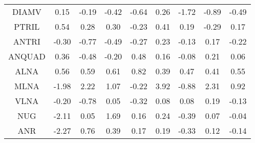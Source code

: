 \documentclass[11pt,a4paper]{report}
\begin{document}
\begin{longtable}{ | c || c | c | c | c | c | c | c || c |}
DIAMV &  \cellcolor[HTML]{FFFFFF} 0.15 &  \cellcolor[HTML]{FFF7F7} -0.19 &  \cellcolor[HTML]{FFF7F7} -0.42 &  \cellcolor[HTML]{FFEFEF} -0.64 &  \cellcolor[HTML]{F7F7FF} 0.26 &  \cellcolor[HTML]{FFD7D7} -1.72 &  \cellcolor[HTML]{FFE7E7} -0.89 &  \cellcolor[HTML]{FFEFEF} -0.49 \\
PTRIL &  \cellcolor[HTML]{EFEFFF} 0.54 &  \cellcolor[HTML]{F7F7FF} 0.28 &  \cellcolor[HTML]{F7F7FF} 0.30 &  \cellcolor[HTML]{FFF7F7} -0.23 &  \cellcolor[HTML]{F7F7FF} 0.41 &  \cellcolor[HTML]{F7F7FF} 0.19 &  \cellcolor[HTML]{FFF7F7} -0.29 &  \cellcolor[HTML]{F7F7FF} 0.17 \\
ANTRI &  \cellcolor[HTML]{FFF7F7} -0.30 &  \cellcolor[HTML]{FFEFEF} -0.77 &  \cellcolor[HTML]{FFEFEF} -0.49 &  \cellcolor[HTML]{FFF7F7} -0.27 &  \cellcolor[HTML]{F7F7FF} 0.23 &  \cellcolor[HTML]{FFFFFF} -0.13 &  \cellcolor[HTML]{F7F7FF} 0.17 &  \cellcolor[HTML]{FFF7F7} -0.22 \\
ANQUAD &  \cellcolor[HTML]{F7F7FF} 0.36 &  \cellcolor[HTML]{FFEFEF} -0.48 &  \cellcolor[HTML]{FFF7F7} -0.20 &  \cellcolor[HTML]{F7F7FF} 0.48 &  \cellcolor[HTML]{F7F7FF} 0.16 &  \cellcolor[HTML]{FFFFFF} -0.08 &  \cellcolor[HTML]{F7F7FF} 0.21 &  \cellcolor[HTML]{FFFFFF} 0.06 \\
ALNA &  \cellcolor[HTML]{EFEFFF} 0.56 &  \cellcolor[HTML]{EFEFFF} 0.59 &  \cellcolor[HTML]{EFEFFF} 0.61 &  \cellcolor[HTML]{E7E7FF} 0.82 &  \cellcolor[HTML]{F7F7FF} 0.39 &  \cellcolor[HTML]{F7F7FF} 0.47 &  \cellcolor[HTML]{F7F7FF} 0.41 &  \cellcolor[HTML]{EFEFFF} 0.55 \\
MLNA &  \cellcolor[HTML]{FFCFCF} -1.98 &  \cellcolor[HTML]{C7C7FF} 2.22 &  \cellcolor[HTML]{E7E7FF} 1.07 &  \cellcolor[HTML]{FFF7F7} -0.22 &  \cellcolor[HTML]{9F9FFF} 3.92 &  \cellcolor[HTML]{FFE7E7} -0.88 &  \cellcolor[HTML]{C7C7FF} 2.31 &  \cellcolor[HTML]{E7E7FF} 0.92 \\
VLNA &  \cellcolor[HTML]{FFF7F7} -0.20 &  \cellcolor[HTML]{FFEFEF} -0.78 &  \cellcolor[HTML]{FFFFFF} 0.05 &  \cellcolor[HTML]{FFF7F7} -0.32 &  \cellcolor[HTML]{FFFFFF} 0.08 &  \cellcolor[HTML]{FFFFFF} 0.08 &  \cellcolor[HTML]{F7F7FF} 0.19 &  \cellcolor[HTML]{FFFFFF} -0.13 \\
NUG &  \cellcolor[HTML]{FFC7C7} -2.11 &  \cellcolor[HTML]{FFFFFF} 0.05 &  \cellcolor[HTML]{D7D7FF} 1.69 &  \cellcolor[HTML]{FFFFFF} 0.16 &  \cellcolor[HTML]{F7F7FF} 0.24 &  \cellcolor[HTML]{FFF7F7} -0.39 &  \cellcolor[HTML]{FFFFFF} 0.07 &  \cellcolor[HTML]{FFFFFF} -0.04 \\
ANR &  \cellcolor[HTML]{FFC7C7} -2.27 &  \cellcolor[HTML]{EFEFFF} 0.76 &  \cellcolor[HTML]{F7F7FF} 0.39 &  \cellcolor[HTML]{F7F7FF} 0.17 &  \cellcolor[HTML]{F7F7FF} 0.19 &  \cellcolor[HTML]{FFF7F7} -0.33 &  \cellcolor[HTML]{FFFFFF} 0.12 &  \cellcolor[HTML]{FFFFFF} -0.14 \\

\end{longtable}
\end{document}
